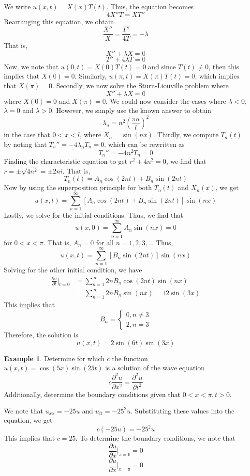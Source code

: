 \documentclass[11pt]{article}
\theoremstyle{plain} %
\theoremstyle{definition}
\theoremstyle{example}
\newtheorem*{example}{Example}
\theoremstyle{remark}
\begin{document}
We write $u(x,t) = X(x)T(t)$. Thus, the equation becomes $$4X''T = XT''$$ Rearranging this equation, we obtain $$\frac{X''}{X} = \frac{T''}{4T} = -\lambda$$
That is, $$X'' + \lambda X = 0$$ $$T'' + 4\lambda T = 0$$
Now, we note that $u(0,t) = X(0) T(t) = 0$ and since $T(t) \neq 0$, then this implies that $X(0) = 0$. Similarly, $u(\pi, t) = X(\pi)T(t) = 0$, which implies that $X(\pi) = 0$. 
Secondly, we now solve the Sturn-Liouville problem where 
$$X'' + \lambda X = 0$$ where $X(0) = 0$ and $X(\pi) = 0$. We could now consider the cases where $\lambda < 0$, $\lambda = 0$ and $\lambda > 0$. However, we simply use the known answer to obtain $$\lambda_n = n^2\left(\frac{\pi n}{l}\right)^2$$ in the case that $0 < x < l$, where $X_n = \sin(nx)$.
Thirdly, we compute $T_n(t)$ by noting that $T_n'' = -4\lambda_nT_n = 0$, which can be rewritten as $$T_n'' = -4n^2T_n = 0$$ Finding the characteristic equation to get $r^2 + 4n^2 = 0$, we find that $r = \pm\sqrt{4n^2} = \pm 2ni$. That is, 
$$T_n(t) = A_n\cos(2nt) + B_n\sin(2nt)$$ Now by using the superposition principle for both $T_n(t) $ and $X_n(x)$, we get 
$$u(x,t) = \sum_{n=1}^{\infty}\left[ A_n\cos(2nt) + B_n\sin(2nt)\right]\sin(nx)$$
Lastly, we solve for the initial conditions. Thus, we find that 
$$u(x,0) = \sum_{n=1}^{\infty}A_n\sin(nx) = 0$$
for $0 < x < \pi$. That is, $A_n = 0$ for all $n = 1, 2, 3, ...$ Thus, 
$$u(x,t) = \sum_{n=1}^{\infty}\left[ B_n\sin(2nt)\right]\sin(nx)$$
Solving for the other initial condition, we have 
\begin{align*}
\frac{\partial u}{\partial t} \Big|_{t=0} &= \sum_{n=1}^{\infty}2nB_n\cos(2nt)\sin(nx)\\
&= \sum_{n=1}^{\infty}2nB_n\sin(nx) = 12\sin(3x)
\end{align*}
This implies that 
$$B_n =\begin{cases}0, n \neq 3\\2, n = 3 \end{cases}$$Therefore, the solution is 
$$u(x,t) = 2\sin(6t)\sin(3x)$$

\begin{example}
Determine for which $c$ the function $u(x,t) = \cos(5x)\sin(25t)$ is a solution of the wave equation 
$$c\frac{\partial ^2 u }{\partial x^2} = \frac{\partial ^2 u}{\partial t^2}$$ Additionally, determine the boundary conditions given that $0 < x < \pi ,t > 0$.
\end{example}

We note that $u_{xx} = -25u$ and $u_{tt} = -25^2u$. Substituting these values into the equation, we get 
$$c(-25u) = -25^2u$$ This implies that $c = 25$. To determine the boundary conditions, we note that 
$$\frac{\partial u}{\partial x}\Big|_{x=0} = 0$$
$$\frac{\partial u}{\partial x}\Big|_{x=\pi} = 0$$
\end{document}
